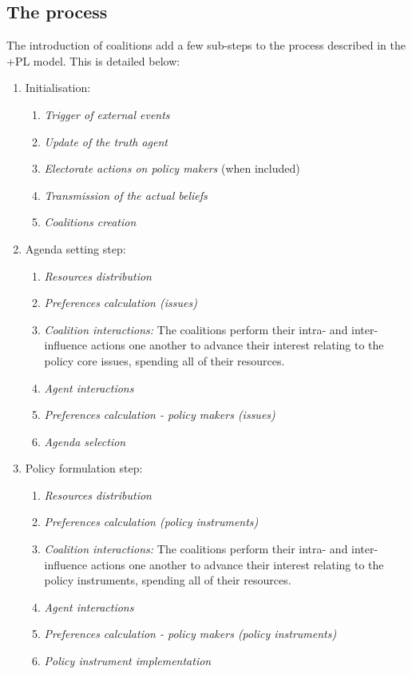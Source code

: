 \documentclass[11pt]{article}
\begin{document}
\subsection{The process}

The introduction of coalitions add a few sub-steps to the process described in the +PL model. This is detailed below:

\begin{enumerate}
\item Initialisation:
	
	\begin{enumerate}
	\item \emph{Trigger of external events}
	\item \emph{Update of the truth agent}
	\item \emph{Electorate actions on policy makers} (when included)
	\item \emph{Transmission of the actual beliefs}
	\item \emph{Coalitions creation}
	\end{enumerate}
	
\item Agenda setting step:
	\begin{enumerate}
	\item \emph{Resources distribution}
	\item \emph{Preferences calculation (issues)}
	\item \emph{Coalition interactions:} The coalitions perform their intra- and inter-influence actions one another to advance their interest relating to the policy core issues, spending all of their resources.
	\item \emph{Agent interactions}
	\item \emph{Preferences calculation - policy makers (issues)}
	\item \emph{Agenda selection}
	\end{enumerate}
	
\item Policy formulation step:
	\begin{enumerate}
	\item \emph{Resources distribution}
	\item \emph{Preferences calculation (policy instruments)}
	\item \emph{Coalition interactions:} The coalitions perform their intra- and inter-influence actions one another to advance their interest relating to the policy instruments, spending all of their resources.
	\item \emph{Agent interactions}
	\item \emph{Preferences calculation - policy makers (policy instruments)}
	\item \emph{Policy instrument implementation} 
	\end{enumerate}

\end{enumerate}
\end{document}
